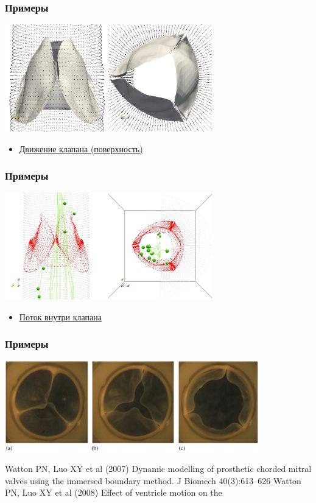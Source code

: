\documentclass[14pt]{beamer}
\begin{document}
\begin{frame}
\frametitle{Примеры}
    \begin{center}
        \includegraphics[width=9cm]{valve_delaunay.png}
    \end{center}

\begin{itemize}
    \item[\MVRightarrow] \href{run:video/valve_delaunay.avi}{Движение клапана (поверхность)}
\end{itemize}
\end{frame}

\begin{frame}
\frametitle{Примеры}
    \begin{center}
        \includegraphics[width=9cm]{valve_flow.png}
    \end{center}

\begin{itemize}
    \item[\MVRightarrow] \href{run:video/valve_flow.avi}{Поток внутри клапана}
\end{itemize}
\end{frame}

\begin{frame}
\frametitle{Примеры}
    \begin{center}
        \includegraphics[width=11cm]{aortic_valves.jpg}
    \end{center}

\begin{spacing}{0.5}
{\scriptsize
    Watton PN, Luo XY et al (2007) Dynamic modelling of prosthetic
    chorded mitral valves using the immersed boundary method.
    J Biomech 40(3):613–626 Watton PN, Luo XY et al (2008) Effect of ventricle motion on the
}
\end{spacing}

\end{frame}
\end{document}
